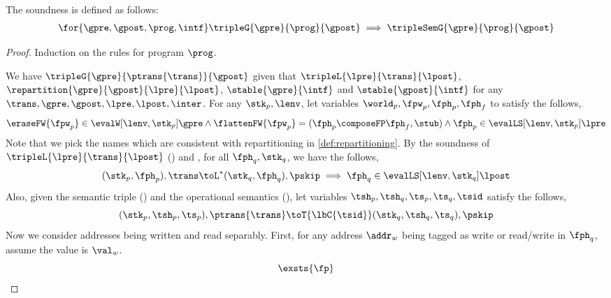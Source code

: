 \begin{thm}[Soundness]
The soundness is defined as follows:
\[
    \begin{array}{@{}l@{}}
        \for{\gpre, \gpost, \prog, \intf } \tripleG{\gpre}{\prog}{\gpost} \implies \tripleSemG{\gpre}{\prog}{\gpost}
    \end{array}
\]
\end{thm}
\begin{proof}
Induction on the rules for program \( \prog \).

We have \( \tripleG{\gpre}{\ptrans{\trans}}{\gpost} \) given that \( \tripleL{\lpre}{\trans}{\lpost} \), \( \repartition{\gpre}{\gpost}{\lpre}{\lpost} \), \( \stable{\gpre}{\intf} \) and \( \stable{\gpost}{\intf} \) for any \( \trans, \gpre, \gpost, \lpre, \lpost, \inter \). 
For any \( \stk_{p}, \lenv \), let variables \( \world_{p}, \fpw_{p}, \fph_{p}, \fph_{f} \) to satisfy the follows,
\begin{equation}
    \label{equ:def-wwhh}
    \eraseFW{\fpw_{p}} \in \evalW[\lenv, \stk_{p}]{\gpre} 
    \land \flattenFW{\fpw_{p}} = (\fph_{p} \composeFP \fph_{f}, \stub)
    \land \fph_{p} \in \evalLS[\lenv, \stk_{p}]{\lpre}
\end{equation}
Note that we pick the names which are consistent with repartitioning in  \ref{def:repartitioning}.
By the soundness of \( \tripleL{\lpre}{\trans}{\lpost} \) () and , for all \( \fph_{q}, \stk_{q} \), we have the follows,
\begin{equation}
    \label{equ:transaction-soundness}
    (\stk_{p}, \fph_{p} ), \trans \toL^{*}  (\stk_{q}, \fph_{q} ), \pskip 
    \implies \fph_{q} \in \evalLS[\lenv, \stk_{q}]{\lpost}
\end{equation}
Also, given the semantic triple () and the operational semantics (), let variables \( \tsh_{p}, \tsh_{q}, \ts_{p}, \ts_{q}, \tsid \) satisfy the follows,
\begin{equation}
    \label{equ:commit-current-trans}
    (\stk_{p}, \tsh_{p}, \ts_{p}), \ptrans{\trans} \toT{\lbC{\tsid}} (\stk_{q}, \tsh_{q}, \ts_{q}), \pskip 
\end{equation}
Now we consider addresses being written and read separably.
First, for any address \( \addr_{w} \) being tagged as write or read/write in \( \fph_{q} \), assume the value is \( \val_{w} \).
\begin{equation}
    \label{equ:local-write}
    \exsts{\fp} 

\end{equation}
\end{proof}
